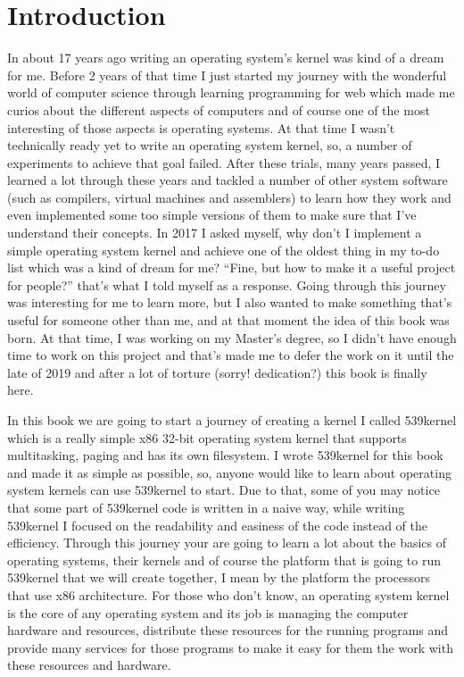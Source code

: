 \chapter*{Introduction}\label{introduction}

In about 17 years ago writing an operating system's kernel was kind of a
dream for me. Before 2 years of that time I just started my journey with
the wonderful world of computer science through learning programming for
web which made me curios about the different aspects of computers and of
course one of the most interesting of those aspects is operating
systems. At that time I wasn't technically ready yet to write an
operating system kernel, so, a number of experiments to achieve that
goal failed. After these trials, many years passed, I learned a lot
through these years and tackled a number of other system software (such
as compilers, virtual machines and assemblers) to learn how they work
and even implemented some too simple versions of them to make sure that
I've understand their concepts. In 2017 I asked myself, why don't I
implement a simple operating system kernel and achieve one of the oldest
thing in my to-do list which was a kind of dream for me? ``Fine, but how
to make it a useful project for people?'' that's what I told myself as a
response. Going through this journey was interesting for me to learn
more, but I also wanted to make something that's useful for someone
other than me, and at that moment the idea of this book was born. At
that time, I was working on my Master's degree, so I didn't have enough
time to work on this project and that's made me to defer the work on it
until the late of 2019 and after a lot of torture (sorry! dedication?)
this book is finally here.

In this book we are going to start a journey of creating a kernel I
called 539kernel which is a really simple x86 32-bit operating system
kernel that supports multitasking, paging and has its own filesystem. I
wrote 539kernel for this book and made it as simple as possible, so,
anyone would like to learn about operating system kernels can use
539kernel to start. Due to that, some of you may notice that some part
of 539kernel code is written in a naive way, while writing 539kernel I
focused on the readability and easiness of the code instead of the
efficiency. Through this journey your are going to learn a lot about the
basics of operating systems, their kernels and of course the platform
that is going to run 539kernel that we will create together, I mean by
the platform the processors that use x86 architecture. For those who
don't know, an operating system kernel is the core of any operating
system and its job is managing the computer hardware and resources,
distribute these resources for the running programs and provide many
services for those programs to make it easy for them the work with these
resources and hardware.

